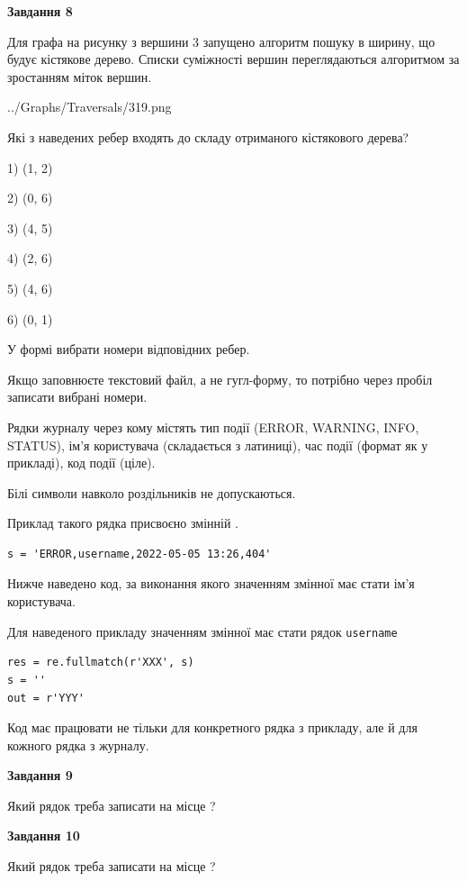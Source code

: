 \documentclass[12pt, ukrainian]{article}
\def\code#1{\Verb!#1!}
\begin{document}
{\begin {large}
{\begin {center}\textbf{Завдання 8}\end {center}}\par
Для графа на рисунку з вершини 3 запущено алгоритм пошуку в ширину, що будує кістякове дерево. Списки суміжності вершин переглядаються алгоритмом за зростанням міток вершин.\par
\begin{center}
	{../Graphs/Traversals/319.png}
\end{center}
\par Які з наведених ребер входять до складу отриманого кістякового дерева?\par
1) (1, 2)\par
2) (0, 6)\par
3) (4, 5)\par
4) (2, 6)\par
5) (4, 6)\par
6) (0, 1)\par
{\vskip 15pt} У формі вибрати номери відповідних ребер.


Якщо заповнюєте текстовий файл, а не гугл-форму, то потрібно через пробіл записа\-ти вибрані номери.\par
\newpage


Рядки журналу через кому містять тип події (ERROR, WARNING, INFO, STATUS), ім'я користувача (складається з латиниці), час події (фор\-мат як у прикладі), код події (ціле).

Білі символи навколо роздільників не допускаються.

Приклад такого рядка присвоєно змінній .



\begin{verbatim}
s = 'ERROR,username,2022-05-05 13:26,404'
\end{verbatim}


Нижче наведено код, за виконання якого значенням змінної  має стати ім'я користувача.

Для наведеного прикладу значенням змінної  має стати рядок \code{username}



\begin{verbatim}
res = re.fullmatch(r'XXX', s)
s = ''
out = r'YYY'
\end{verbatim}


Код має працювати не тільки для конкретного рядка з прикладу, але й для кожного рядка з журналу.

{\begin {center}\textbf{Завдання 9}\end {center}}\par
Який рядок треба записати на місце  ?\par
\vspace{5mm}


{\begin {center}\textbf{Завдання 10}\end {center}}\par
Який рядок треба записати на місце  ?\par


\newpage


\end {large}}
\end{document}
